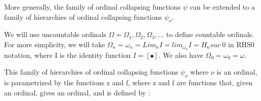 \documentclass[10pt]{article}
\begin{document}
\begin{comment}
\bigskip

Classically, other authors often call \( \psi_\kappa \) the function that I call \( \psi_{1+\kappa} \). This convention implies the slightly more complicated rules:

\begin{itemize}
     \setlength{\itemsep}{1pt}
     \setlength{\parskip}{0pt}
     \setlength{\parsep}{0pt}

\item \( \psi_\nu(0) = z(n) \) 

\item \( \psi_\nu(suc\ \alpha) = f(\psi_\nu(\alpha)) \) 

\item \( \psi_\nu(Lim_{\kappa+1} h) = Lim_{\kappa+1}(\psi_\nu \circ h) \) if \( \kappa < \nu \), 
 or with fundamental sequence notation : \( \psi_\nu(\alpha)[\eta] = \psi_\nu(\alpha[\eta]) \)

\item \( \psi_\nu(Lim_{\kappa+1} h) = lim [ (\psi_\nu \circ h)^\bullet (\zeta) ] \) if \(\kappa \ge \nu \), with \( \zeta = 0 \) or 1 or \( \psi_\nu(0) \) for example.

\end{itemize}

\end{comment}

\begin{comment}
To simplify notation, \( \psi_1 \) will sometimes be written \( \psi \).
\end{comment}

More generally, the family of ordinal collapsing functions \( \psi \) can be extended to a family of hierarchies of ordinal collapsing functions \( \psi_\nu \). 

We will use uncountable ordinals \( \Omega = \Omega_1, \Omega_2, \Omega_3, \ldots \) to define countable ordinals. For more simplicity, we will take \( \Omega_\kappa = \omega_\kappa = Lim_\kappa I = lim_{\omega_\kappa} I =  H_\kappa suc\ 0 \) in RHS0 notation, where I is the identity function \( I = [\bullet] \). We also have \( \Omega_0 = \omega_0 = \omega \).

This family of hierarchies of ordinal collapsing functions \( \psi_\nu \) where \( \nu \) is an ordinal, is parametrized by the functions z and f, where z and f are functions  that, given an ordinal, gives an ordinal, and is defined by : 
\end{document}
